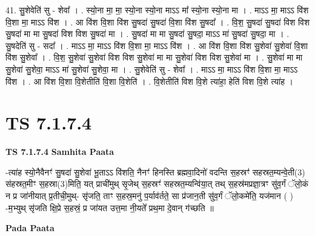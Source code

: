 \documentclass[17pt]{extarticle}
\begin{document}
41. सु॒शेवेति॑ सु - शेवा᳚ । . स्यो॒ना मा॒ मा॒ स्यो॒ना स्यो॒ना माऽऽ मा᳚ स्यो॒ना स्यो॒ना मा । . माऽऽ मा॒ माऽऽ वि॑श वि॒शा मा॒ माऽऽ वि॑श । . आ वि॑श वि॒शा वि॑श सु॒षदा॑ सु॒षदा॑ वि॒शा वि॑श सु॒षदा᳚ । . वि॒श॒ सु॒षदा॑ सु॒षदा॑ विश विश सु॒षदा॑ मा मा सु॒षदा॑ विश विश सु॒षदा॑ मा । . सु॒षदा॑ मा मा सु॒षदा॑ सु॒षदा॒ माऽऽ मा॑ सु॒षदा॑ सु॒षदा॒ मा । . सु॒षदेति॑ सु - सदा᳚ । . माऽऽ मा॒ माऽऽ वि॑श वि॒शा मा॒ माऽऽ वि॑श । . आ वि॑श वि॒शा वि॑श सु॒शेवा॑ सु॒शेवा॑ वि॒शा वि॑श सु॒शेवा᳚ । . वि॒श॒ सु॒शेवा॑ सु॒शेवा॑ विश विश सु॒शेवा॑ मा मा सु॒शेवा॑ विश विश सु॒शेवा॑ मा । . सु॒शेवा॑ मा मा सु॒शेवा॑ सु॒शेवा॒ माऽऽ मा॑ सु॒शेवा॑ सु॒शेवा॒ मा । . सु॒शेवेति॑ सु - शेवा᳚ । . माऽऽ मा॒ माऽऽ वि॑श वि॒शा मा॒ माऽऽ वि॑श । . आ वि॑श वि॒शा वि॒शेतीति॑ वि॒शा वि॒शेति॑ । . वि॒शेतीति॑ विश वि॒शे त्या॑हा॒ हेति॑ विश वि॒शे त्या॑ह । \newline
\pagebreak
{}

\section{ TS 7.1.7.4 }

\textbf{TS 7.1.7.4 } \newline
\textbf{Samhita Paata} \newline

-त्या॑ह स्यो॒नैवैनꣳ॑ सु॒षदा॑ सु॒शेवा॑ भू॒ताऽऽ वि॑शति॒ नैनꣳ॑ हिनस्ति ब्रह्मवा॒दिनो॑ वदन्ति स॒हस्रꣳ॑ सहस्रत॒म्यन्वे॒ती(3) स॑हस्रत॒मीꣳ स॒हस्रा(3)मिति॒ यत् प्राची॑मुथ् सृ॒जेथ् स॒हस्रꣳ॑ सहस्रत॒म्यन्वि॑या॒त् तथ् स॒हस्र॑मप्रज्ञा॒त्रꣳ सु॑व॒र्गं ॅलो॒कं न प्र जा॑नीयात् प्र॒तीची॒मुथ्- सृ॑जति॒ ताꣳ स॒हस्र॒मनु॑ प॒र्याव॑र्तते॒ सा प्र॑जान॒ती सु॑व॒र्गं ॅलो॒कमे॑ति॒ यज॑मान ( ) -म॒भ्युथ् सृ॑जति क्षि॒प्रे स॒हस्रं॒ प्र जा॑यत उत्त॒मा नी॒यते᳚ प्रथ॒मा दे॒वान् ग॑च्छति ॥ \newline

\textbf{Pada Paata} \newline
\end{document}
